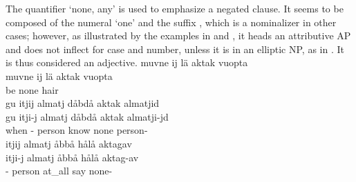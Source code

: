 The quantifier  ‘none, any’ is used to emphasize a negated clause. 
It seems to be composed of the numeral  ‘one’ and the suffix , which is a nominalizer in other cases; however, as illustrated by the examples in  and , it heads an attributive AP and does not inflect for case and number, unless it is in an elliptic NP, %
as in . 
It is thus considered an adjective. 
\ea\label{noneEx1}
\glll	muvne ij lä aktak vuopta\\
	muvne ij lä aktak vuopta\\
	 \BS{} be\BS{} none hair\BS{}\\\nopagebreak
{}	
\z
\ea\label{noneEx2}
\glll	gu itjij almatj dåbdå aktak almatjid\\
	gu itji-j almatj dåbdå aktak almatji-jd\\
	when - person\BS{} know\BS{} none person-\\\nopagebreak
{}	
\z
\ea\label{noneEx3}
\glll	itjij almatj åbbå hålå aktagav\\
	itji-j almatj åbbå hålå aktag-av\\
	- person\BS{} at\_all say\BS{} none-\\\nopagebreak
{}	
\z

